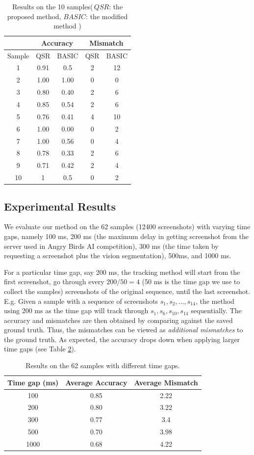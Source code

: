 \documentclass[letterpaper]{article}
\begin{document}
\begin{table}[h!]
\caption{Results on the 10 samples(\,$QSR$: the proposed method, $BASIC$: the modified method )}\label{empiResults}
\centering
\begin{tabular}{c|c|c|c|c}
\hline
{} & \multicolumn{2}{c}{Accuracy} & \multicolumn{2}{c}{Mismatch}\\
\hline
Sample & QSR & BASIC & QSR & BASIC\\
\hline
1& 0.91 & 0.5 & 2 & 12\\
2&1.00 & 1.00 & 0 & 0\\
3&0.80 & 0.40 & 2 & 6\\
4&0.85 & 0.54 & 2 & 6\\
5&0.76 & 0.41 & 4 & 10\\
6&1.00 & 0.00 & 0 & 2\\
7&1.00 & 0.56 & 0 & 4\\
8&0.78 & 0.33 & 2 & 6 \\
9&0.71 & 0.42 & 2 & 4\\
10&1 & 0.5 & 0 & 2\\
\hline
\end{tabular}
\end{table}

\subsection{Experimental Results}

We evaluate our method on the 62 samples (12400 screenshots) with varying time gaps, namely 100 ms, 200 ms (the maximum delay in getting screenshot from the server used in Angry Birds AI competition), 300 ms (the time taken by requesting a screenshot plus the vision segmentation), 500ms, and 1000 ms.

For a particular time gap, say 200 ms, the tracking method will start from the first screenshot, go through every $200/50 = 4$ (50 ms is the time gap we use to collect the samples) screenshots of the original sequence, until the last screenshot. E.g. Given a sample with a sequence of screenshots $s_1, s_2, ..., s_{14}$, the method using 200 ms as the time gap will track through $s_1, s_6, s_{10}, s_{14}$ sequentially. The accuracy and mismatches are then obtained by comparing against the saved ground truth. Thus, the mismatches can be viewed as \emph{additional mismatches} to the ground truth. As expected, the accuracy drops down when applying larger time gaps (see Table \ref{empiResults_2}). 

\begin{table}[h!]
\caption{Results on the 62 samples with different time gaps. }\label{empiResults_2}
\centering
\begin{tabular}{c|c|c}
\hline
Time gap (ms) & Average Accuracy & Average Mismatch\\
\hline
100 & 0.85 & 2.22\\
200 & 0.80 & 3.22\\
300 & 0.77 & 3.4\\
500 & 0.70 & 3.98\\
1000 & 0.68 & 4.22\\
\hline
\end{tabular}
\end{table}
\end{document}

